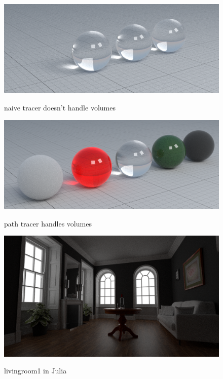 \documentclass[12pt]{report}
\begin{document}
    \begin{figure}[h]
        \caption{naive tracer doesn't handle volumes}
        \includegraphics[width=\textwidth]{materials4_naive}
        \centering
        \label{fig:materials4_naive}
    \end{figure}

    \begin{figure}[h]
        \caption{path tracer handles volumes}
        \includegraphics[width=\textwidth]{materials4_path}
        \centering
        \label{fig:materials4_path}
    \end{figure}

    \begin{figure}[h]
        \caption{livingroom1 in Julia}
        \includegraphics[width=\textwidth]{livingroom1_path}
        \centering
        \label{fig:livingroom1_path}
    \end{figure}
\end{document}
